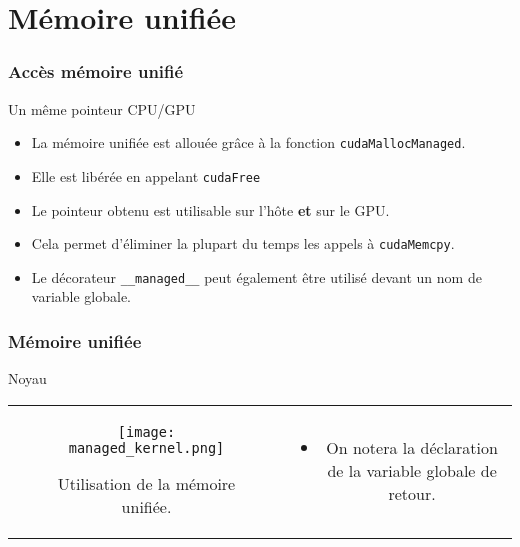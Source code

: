 \section{Mémoire unifiée}
\begin{frame}[fragile]
    \frametitle{Accès mémoire unifié}
\begin{block}{Un même pointeur CPU/GPU}
    \begin{itemize}
        \item<+-> La mémoire unifiée est allouée grâce à la fonction \texttt{cudaMallocManaged}.
        \item<+-> Elle est libérée en appelant \texttt{cudaFree}
        \item<+-> Le pointeur obtenu est utilisable sur l'hôte \textbf{et} sur le GPU.
        \item<+-> Cela permet d'éliminer la plupart du temps les appels à \texttt{cudaMemcpy}.
        \item<+-> Le décorateur \texttt{\_\_managed\_\_} peut également être utilisé devant un nom de variable globale.
    \end{itemize}
\end{block}
\end{frame}
\begin{frame}
    \frametitle{Mémoire unifiée}
\begin{block}{Noyau}
   \begin{tabular}{cc}
        \begin{minipage}{0.45\textwidth}
 \begin{figure}[htbp]
    \centering
   \texttt{[image: managed\_kernel.png]}
    \caption{Utilisation de la mémoire unifiée.}
    \label{fig:Noyau}
\end{figure}
        \end{minipage} & 
        \begin{minipage}{0.45\textwidth}
            \begin{itemize}
                \item<+-> On notera la déclaration de la variable globale de retour.
           \end{itemize}
        \end{minipage}
\end{tabular}
\end{block}
\end{frame}
